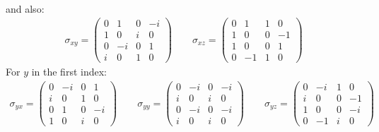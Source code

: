 \documentclass[12pt,a4]{article}
\begin{document}
\begin{enumerate}
\begin{align*}
    \end{align*}
    and also:
    \begin{align*}
      \sigma_{xy} =   \left(\begin{matrix}
                        0 &  1 & 0 & -i\\
                        1 &  0 & i &  0\\
                        0 & -i & 0 &  1\\
                        i &  0 & 1 &  0
                      \end{matrix} \right)
                      \qquad
      \sigma_{xz} =   \left(\begin{matrix}
                        0 &  1 & 1 &  0\\
                        1 &  0 & 0 & -1\\
                        1 &  0 & 0 &  1\\
                        0 & -1 & 1 &  0
                      \end{matrix} \right)
    \end{align*}
    For $y$ in the first index:
    \begin{align*}
      \sigma_{yx} =   \left(\begin{matrix}
                        0 & -i & 0 &  1\\
                        i &  0 & 1 &  0\\
                        0 &  1 & 0 & -i\\
                        1 &  0 & i &  0
                      \end{matrix} \right)
                      \qquad
      \sigma_{yy} =   \left(\begin{matrix}
                        0 & -i & 0 & -i\\
                        i &  0 & i &  0\\
                        0 & -i & 0 & -i\\
                        i &  0 & i &  0
                      \end{matrix} \right)
                      \qquad
      \sigma_{yz} =   \left(\begin{matrix}
                        0 & -i & 1 &  0\\
                        i &  0 & 0 & -1\\
                        1 &  0 & 0 & -i\\
                        0 & -1 & i &  0
                      \end{matrix} \right)

\end{align*}
\end{enumerate}
\end{document}
